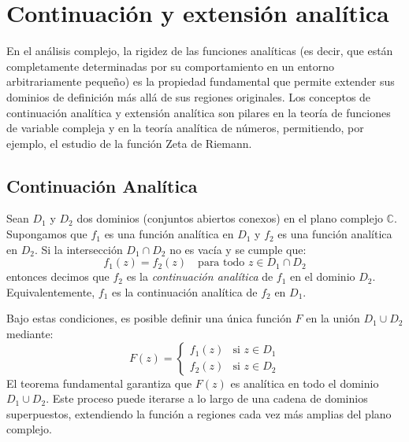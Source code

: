 \documentclass[a4paper]{article}
\begin{document}
\section{Continuación y extensión analítica}

En el análisis complejo, la rigidez de las funciones analíticas (es decir, que están completamente determinadas por su comportamiento en un entorno arbitrariamente pequeño) es la propiedad fundamental que permite extender sus dominios de definición más allá de sus regiones originales. Los conceptos de continuación analítica y extensión analítica son pilares en la teoría de funciones de variable compleja y en la teoría analítica de números, permitiendo, por ejemplo, el estudio de la función Zeta de Riemann.

\subsection*{Continuación Analítica}
Sean $D_1$ y $D_2$ dos dominios (conjuntos abiertos conexos) en el plano complejo $\mathbb{C}$. Supongamos que $f_1$ es una función analítica en $D_1$ y $f_2$ es una función analítica en $D_2$. Si la intersección $D_1 \cap D_2$ no es vacía y se cumple que:
$$ f_1(z) = f_2(z) \quad \text{para todo } z \in D_1 \cap D_2 $$
entonces decimos que $f_2$ es la \textit{continuación analítica} de $f_1$ en el dominio $D_2$. Equivalentemente, $f_1$ es la continuación analítica de $f_2$ en $D_1$. 

Bajo estas condiciones, es posible definir una única función $F$ en la unión $D_1 \cup D_2$ mediante:
$$ F(z) = \begin{cases} f_1(z) & \text{si } z \in D_1 \\ f_2(z) & \text{si } z \in D_2 \end{cases} $$
El teorema fundamental garantiza que $F(z)$ es analítica en todo el dominio $D_1 \cup D_2$. Este proceso puede iterarse a lo largo de una cadena de dominios superpuestos, extendiendo la función a regiones cada vez más amplias del plano complejo.
\end{document}
